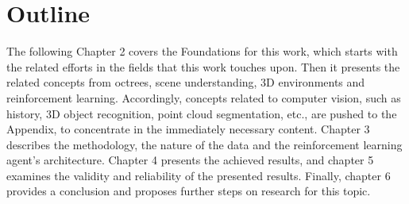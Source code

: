
\section{Outline}\label{chap:1:outline}
The following Chapter 2 covers the Foundations for this work, which starts with the related efforts in the fields that this work touches upon. Then it presents the related concepts from octrees, scene understanding, 3D environments and reinforcement learning. Accordingly, concepts related to computer vision, such as history, 3D object recognition, point cloud segmentation, etc., are pushed to the Appendix, to concentrate in the immediately necessary content. Chapter 3 describes the methodology, the nature of the data and the reinforcement learning agent's architecture. Chapter 4 presents the achieved results, and chapter 5 examines the validity and reliability of the presented results. Finally, chapter 6 provides a conclusion and proposes further steps on research for this topic.


        
        
